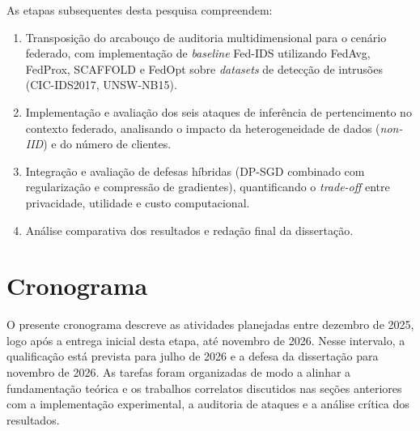 \documentclass[
	12pt,				%
	openright,			%
	oneside,			%
	a4paper,			%
	english,			%
	french,				%
	spanish,			%
	brazil,				%
	]{abntex2}
\begin{document}
As etapas subsequentes desta pesquisa compreendem:

\begin{enumerate}[label=(\roman*)]
    \item Transposição do arcabouço de auditoria multidimensional para o cenário federado, com implementação de \textit{baseline} Fed-IDS utilizando FedAvg, FedProx, SCAFFOLD e FedOpt sobre \textit{datasets} de detecção de intrusões (CIC-IDS2017, UNSW-NB15).
    \item Implementação e avaliação dos seis ataques de inferência de pertencimento no contexto federado, analisando o impacto da heterogeneidade de dados (\textit{non-IID}) e do número de clientes.
    \item Integração e avaliação de defesas híbridas (DP-SGD combinado com regularização e compressão de gradientes), quantificando o \textit{trade-off} entre privacidade, utilidade e custo computacional.
    \item Análise comparativa dos resultados e redação final da dissertação.
\end{enumerate}

\section{Cronograma}
\label{sec:cronograma_tab}

O presente cronograma descreve as atividades planejadas entre dezembro de 2025, logo após a entrega inicial desta etapa, até novembro de 2026. Nesse intervalo, a qualificação está prevista para julho de 2026 e a defesa da dissertação para novembro de 2026. As tarefas foram organizadas de modo a alinhar a fundamentação teórica e os trabalhos correlatos discutidos nas seções anteriores com a implementação experimental, a auditoria de ataques e a análise crítica dos resultados.  
\end{document}
